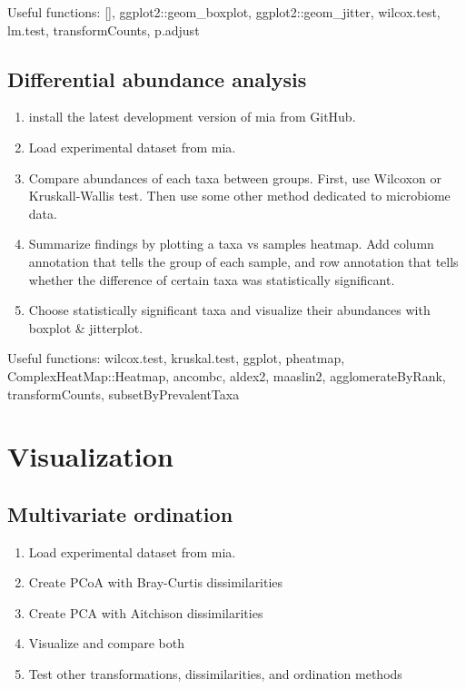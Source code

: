 \documentclass[
]{book}
\providecommand{\tightlist}{%
  \setlength{\itemsep}{0pt}\setlength{\parskip}{0pt}}
\begin{document}
Useful functions: {[}{]}, ggplot2::geom\_boxplot, ggplot2::geom\_jitter, wilcox.test, lm.test, transformCounts, p.adjust

\hypertarget{differential-abundance-analysis-1}{%
\subsection{Differential abundance analysis}\label{differential-abundance-analysis-1}}

\begin{enumerate}
\def\labelenumi{\arabic{enumi}.}
\tightlist
\item
  install the latest development version of mia from GitHub.
\item
  Load experimental dataset from mia.
\item
  Compare abundances of each taxa between groups. First, use Wilcoxon or Kruskall-Wallis test. Then use some other method dedicated to microbiome data.
\item
  Summarize findings by plotting a taxa vs samples heatmap. Add column annotation that tells the group of each sample, and row annotation that tells whether the difference of certain taxa was statistically significant.
\item
  Choose statistically significant taxa and visualize their abundances with boxplot \& jitterplot.
\end{enumerate}

Useful functions: wilcox.test, kruskal.test, ggplot, pheatmap, ComplexHeatMap::Heatmap, ancombc, aldex2, maaslin2, agglomerateByRank, transformCounts, subsetByPrevalentTaxa

\hypertarget{visualization-1}{%
\section{Visualization}\label{visualization-1}}

\hypertarget{multivariate-ordination}{%
\subsection{Multivariate ordination}\label{multivariate-ordination}}

\begin{enumerate}
\def\labelenumi{\arabic{enumi}.}
\tightlist
\item
  Load experimental dataset from mia.
\item
  Create PCoA with Bray-Curtis dissimilarities
\item
  Create PCA with Aitchison dissimilarities
\item
  Visualize and compare both
\item
  Test other transformations, dissimilarities, and ordination methods
\end{enumerate}
\end{document}
